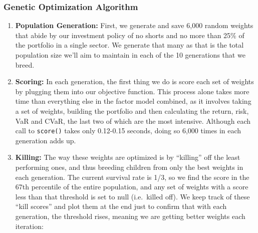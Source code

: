 \documentclass[]{article}
\begin{document}
\hypertarget{genetic-optimization-algorithm}{%
\subsubsection{Genetic Optimization
Algorithm}\label{genetic-optimization-algorithm}}

\begin{enumerate}
\def\labelenumi{\arabic{enumi}.}
\item
  \textbf{Population Generation:} First, we generate and save 6,000
  random weights that abide by our investment policy of no shorts and no
  more than 25\% of the portfolio in a single sector. We generate that
  many as that is the total population size we'll aim to maintain in
  each of the 10 generations that we breed.
\item
  \textbf{Scoring:} In each generation, the first thing we do is score
  each set of weights by plugging them into our objective function. This
  process alone takes more time than everything else in the factor model
  combined, as it involves taking a set of weights, building the
  portfolio and then calculating the return, risk, VaR and CVaR, the
  last two of which are the most intensive. Although each call to
  \texttt{score()} takes only 0.12-0.15 seconds, doing so 6,000 times in
  each generation adds up.
\item
  \textbf{Killing:} The way these weights are optimized is by
  ``killing'' off the least performing ones, and thus breeding children
  from only the best weights in each generation. The current survival
  rate is 1/3, so we find the score in the 67th percentile of the entire
  population, and any set of weights with a score less than that
  threshold is set to null (i.e.~killed off). We keep track of these
  ``kill scores'' and plot them at the end just to confirm that with
  each generation, the threshold rises, meaning we are getting better
  weights each iteration:
\end{enumerate}
\end{document}
